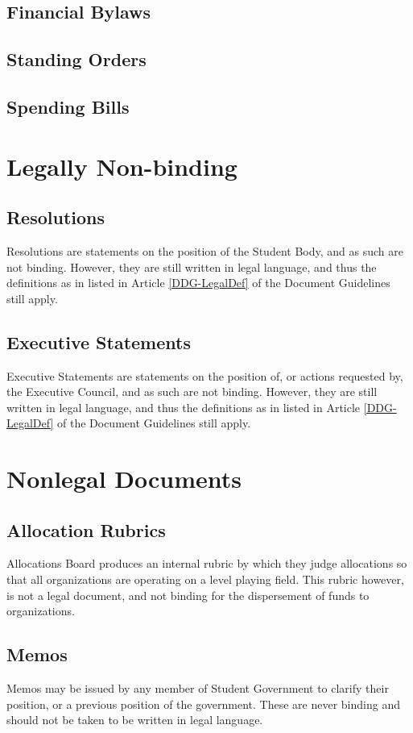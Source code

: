 \documentclass[12pt, letterpaper]{report}
\begin{document}
\begin{linenumbers}
	        \subsection{Financial Bylaws}
	        \subsection{Standing Orders}
	        \subsection{Spending Bills}
        \section{Legally Non-binding}
	        \subsection{Resolutions}
	         Resolutions are statements on the position of the Student Body, and as such are not binding. However, they are still written in legal language, and thus the definitions as in listed in Article \ref{DDG-LegalDef} of the Document Guidelines still apply. 
	         \subsection{Executive Statements}
	          Executive Statements are statements on the position of, or actions requested by, the Executive Council, and as such are not binding. However, they are still written in legal language, and thus the definitions as in listed in Article \ref{DDG-LegalDef} of the Document Guidelines still apply.
	    \section{Nonlegal Documents}
	        \subsection{Allocation Rubrics}
	        Allocations Board produces an internal rubric by which they judge allocations so that all organizations are operating on a level playing field. This rubric however, is not a legal document, and not binding for the dispersement of funds to organizations.
	        \subsection{Memos}
	        Memos may be issued by any member of Student Government to clarify their position, or a previous position of the government. These are never binding and should not be taken to be written in legal language. 

\end{linenumbers}
\end{document}
